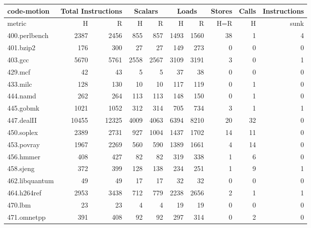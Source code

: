 \documentclass[acmlarge,review,anonymous]{acmart}\settopmatter{printfolios=true}
\begin{document}
\begin{table}[h!]
  \begin{center}
    \begin{tabular}{|l|r|r|r|r|r|r|r|r|r|}
      \hline
 code-motion  &\multicolumn{2}{|c|}{Total Instructions} &\multicolumn{2}{|c|}{Scalars}  & \multicolumn{2}{|c|}{Loads} & \multicolumn{1}{|c|}{Stores} &Calls   &Instructions    \\\hline
 metric           &  H          &R        &H      &R       &H           &R              &H=R    &H & sunk \\\hline
 400.perlbench	  &  2387	& 2456	  &  855  & 857	   & 1493	& 1560		& 38	& 1	& 4	        \\\hline
 401.bzip2	  &  176	& 300	  &  27	  & 27	   & 149	& 273		& 0	& 0 	& 0		\\\hline
 403.gcc	  &  5670	& 5761	  &  2558 & 2567   & 3109	& 3191		& 3	& 0	& 1	        \\\hline
 429.mcf	  &  42	        & 43	  &  5	  & 5	   & 37 	& 38		& 0	& 0 	& 0		\\\hline
 433.milc	  &  128	& 130	  &  10	  & 10	   & 117	& 119		& 0	& 1	& 0		\\\hline
 444.namd	  &  262	& 264	  &  113  & 113	   & 148	& 150		& 0	& 1	& 0		\\\hline
 445.gobmk	  &  1021	& 1052	  &  312  & 314	   & 705	& 734		& 3	& 1	& 1	        \\\hline
 447.dealII	  &  10455	& 12325	  &  4009 & 4063   & 6394	& 8210		& 20	& 32	& 0	        \\\hline
 450.soplex	  &  2389	& 2731	  &  927  & 1004   & 1437	& 1702		& 14	& 11	& 0	        \\\hline
 453.povray	  &  1967	& 2269	  &  560  & 590	   & 1389	& 1661		& 4	& 14	& 0	        \\\hline
 456.hmmer	  &  408	& 427	  &  82	  & 82	   & 319	& 338		& 1	& 6	& 0	        \\\hline
 458.sjeng	  &  372	& 399	  &  128  & 138	   & 234	& 251		& 1	& 9	& 1	        \\\hline
 462.libquantum	  &  49	        & 49	  &  17	  & 17	   & 32	      	& 32		& 0	& 0	& 0		\\\hline
 464.h264ref	  &  2953	& 3438	  &  712  & 779	   & 2238	& 2656		& 2	& 1	& 1	        \\\hline
 470.lbm	  &  23	        & 23	  &  4	  & 4	   & 19		& 19		& 0	& 0	& 0		\\\hline
 471.omnetpp	  &  391	& 408	  &  92	  & 92	   & 297	& 314		& 0	& 2	& 0		\\\hline

\end{tabular}
\end{center}
\end{table}
\end{document}
